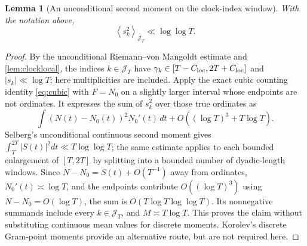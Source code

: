 \documentclass[11pt,reqno]{amsart}
\numberwithin{equation}{section}
\newtheorem{lemma}[theorem]{Lemma}
\newcommand{\avgJ}[1]{\left\langle #1\right\rangle_{\mathcal J_T}}
\begin{document}
\begin{lemma}[An unconditional second moment on the clock-index window]
\label{ov:lem:ordinalmoment}
With the notation above,
\begin{equation}
 \avgJ{s_k^2}\ll\log\log T.
 \label{ov:eq:ordinalmoment}
\end{equation}
\end{lemma}
\begin{proof}
By the unconditional Riemann--von Mangoldt estimate and
\cref{lem:clocklocal}, the indices $k\in\mathcal J_T$ have
$\gamma_k\in[T-C_{\rm loc},2T+C_{\rm loc}]$ and
$|s_k|\ll\log T$; here multiplicities are included.
Apply the exact cubic counting identity \eqref{eq:cubic} with
$F=N_0$ on a slightly larger interval whose endpoints are not
ordinates. It expresses the sum of $s_k^2$ over those true ordinates
as
\[
 \int (N(t)-N_0(t))^2N_0'(t)\,dt
 +O((\log T)^3+T\log T).
\]
Selberg's unconditional continuous second moment gives
$\int_T^{2T}|S(t)|^2dt\ll T\log\log T$; the same estimate applies
to each bounded enlargement of $[T,2T]$ by splitting into a bounded
number of dyadic-length windows. Since
$N-N_0=S(t)+O(T^{-1})$ away from ordinates,
$N_0'(t)\asymp\log T$, and the endpoints contribute
$O((\log T)^3)$ using $N-N_0=O(\log T)$, the sum is
$O(T\log T\log\log T)$. Its nonnegative summands include every
$k\in\mathcal J_T$, and $M\asymp T\log T$.
This proves the claim without substituting continuous mean values
for discrete moments. Korolev's discrete Gram-point moments provide
an alternative route, but are not required here.
\end{proof}
\end{document}
